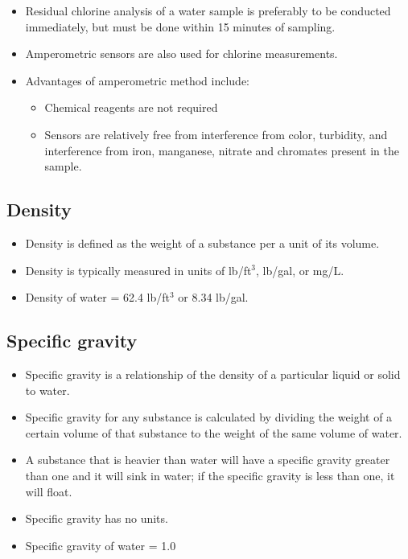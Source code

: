 \begin{itemize}
\item Residual chlorine analysis of a water sample is preferably to be conducted immediately, but must be done within 15 minutes of sampling. 
\item Amperometric sensors  are also used for chlorine measurements.  
\item Advantages of amperometric method include:
\begin{itemize}
\item Chemical reagents are not required
\item Sensors are relatively free from interference from color, turbidity, and interference from iron, manganese, nitrate and chromates present in the sample.
\end{itemize}
\end{itemize}

\subsection{Density}
\begin{itemize}
\item Density is defined as the weight of a substance per a unit of its volume. 
\item Density is typically measured in units of lb/ft$^3$, lb/gal, or mg/L. 
\item Density of water = 62.4 lb/ft$^3$ or 8.34 lb/gal.
\end{itemize}

\subsection{Specific gravity}
\begin{itemize}
\item Specific gravity is a relationship of the density of a particular liquid or solid to water. 
\item Specific gravity for any substance is calculated by dividing the weight of a certain volume of that substance to the weight of the same volume of  water.
\item A substance that is heavier than water will have a specific gravity greater than one and it will sink in water; if the specific gravity is less than one, it will float.
\item Specific gravity has no units. 
\item Specific gravity of water = 1.0 
\end{itemize}

